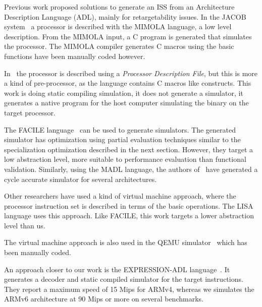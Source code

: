 \documentclass[conference]{ieeeconf}
\begin{document}
Previous work proposed solutions to generate an ISS from an Architecture
Description Language (ADL), mainly for retargetability issues. In the
JACOB system~\cite{Leupers99} a processor is described with the MIMOLA
language, a low level description. From the MIMOLA input, a C program
is generated that simulates the processor. The MIMOLA compiler
generates C macros using the basic functions have been manually coded
however.

In~\cite{Engel:2000:GTS:334012.334036} the processor is described using
a {\em Processor Description File}, but this is more a kind of
pre-processor, as the language contains C macros like constructs.  This
work is doing static compiling simulation, it does not generate a
simulator, it generates a native program for the host computer
simulating the binary on the target processor.

The FACILE language~\cite{facile-schnarr-2001} can be used to generate
simulators.
The generated simulator has optimization using partial evaluation techniques
similar to the specialization optimization described in the next
section. However, they target a low abstraction level, more suitable to
performance evaluation than functional validation.
Similarly, using the MADL language, the authors of~\cite{Qin:2004:FCM:998300.997171}
have generated a cycle accurate simulator for several architectures.

Other researchers have used a kind of virtual machine approach, where the
processor instruction set is described in terms of the basic operations. The
LISA language \cite{naul-braun-jit-iccs} uses this approach. Like FACILE, this
work targets a lower abstraction level than us.

The virtual machine approach is also used in the QEMU simulator~\cite{QEMU}
which has been manually coded.

An approach closer to our work is the EXPRESSION-ADL language~\cite{1151083}.
It generates a decoder and static compiled simulator for the target
instructions. They report a maximum speed of 15 Mips for ARMv4, whereas we
simulates the ARMv6 architecture at 90 Mips or more on several benchmarks.
\end{document}

